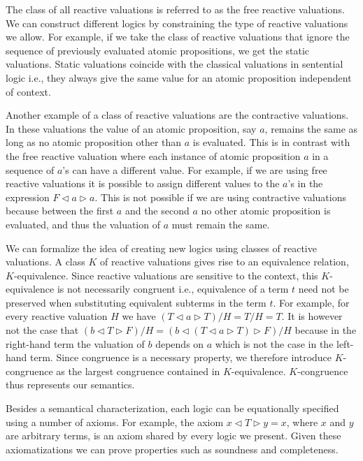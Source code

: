 \documentclass[a4paper,twoside,openright]{report}
\newcommand{\lef}{\ensuremath{\triangleleft}}
\newcommand{\rig}{\ensuremath{\triangleright}}
\begin{document}
The class of all reactive valuations is referred to as the free reactive valuations. We can construct different logics by constraining the type of reactive valuations we allow. For example, if we take the class of reactive valuations that ignore the sequence of previously evaluated atomic propositions, we get the static valuations. Static valuations coincide with the classical valuations in sentential logic i.e., they always give the same value for an atomic proposition independent of context.

Another example of a class of reactive valuations are the contractive valuations. In these valuations the value of an atomic proposition, say $a$, remains the same as long as no atomic proposition other than $a$ is evaluated. This is in contrast with the free reactive valuation where each instance of atomic proposition $a$ in a sequence of $a$'s can have a different value. For example, if we are using free reactive valuations it is possible to assign different values to the $a$'s in the expression $F\lef a\rig a$. This is not possible if we are using contractive valuations because between the first $a$ and the second $a$ no other atomic proposition is evaluated, and thus the valuation of $a$ must remain the same.

We can formalize the idea of creating new logics using classes of reactive valuations. A class $K$ of reactive valuations gives rise to an equivalence relation, $K$-equivalence. Since reactive valuations are sensitive to the context, this $K$-equivalence is not necessarily congruent i.e., equivalence of a term $t$ need not be preserved when substituting equivalent subterms in the term $t$. For example, for every reactive valuation $H$ we have $(T\lef a\rig T)/H=T/H=T$. It is however not the case that $(b\lef T\rig F)/H=(b\lef(T\lef a\rig T)\rig F)/H$ because in the right-hand term the valuation of $b$ depends on $a$ which is not the case in the left-hand term. Since congruence is a necessary property, we therefore introduce $K$-congruence as the largest congruence contained in $K$-equivalence. $K$-congruence thus represents our semantics.

Besides a semantical characterization, each logic can be equationally specified using a number of axioms. For example, the axiom $x\lef T\rig y=x$, where $x$ and $y$ are arbitrary terms, is an axiom shared by every logic we present. Given these axiomatizations we can prove properties such as soundness and completeness.
\end{document}
